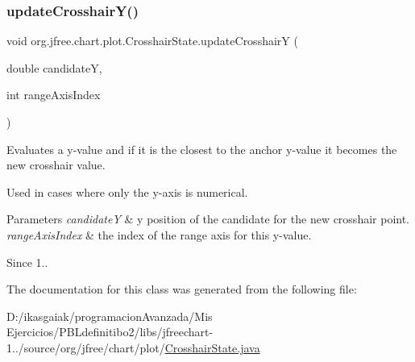 \subsubsection{\texorpdfstring{update\+Crosshair\+Y()}{updateCrosshairY()}\hspace{0.1cm}{\footnotesize\ttfamily [2/2]}}
{\footnotesize\ttfamily void org.\+jfree.\+chart.\+plot.\+Crosshair\+State.\+update\+CrosshairY (\begin{DoxyParamCaption}\item[{double}]{candidateY,  }\item[{int}]{range\+Axis\+Index }\end{DoxyParamCaption})}

Evaluates a y-\/value and if it is the closest to the anchor y-\/value it becomes the new crosshair value. 

Used in cases where only the y-\/axis is numerical.


\begin{DoxyParams}{Parameters}
{\em candidateY} & y position of the candidate for the new crosshair point. \\
\hline
{\em range\+Axis\+Index} & the index of the range axis for this y-\/value.\\
\hline
\end{DoxyParams}
\begin{DoxySince}{Since}
1.. 
\end{DoxySince}


The documentation for this class was generated from the following file\+:\begin{DoxyCompactItemize}
\item 
D\+:/ikasgaiak/programacion\+Avanzada/\+Mis Ejercicios/\+P\+B\+Ldefinitibo2/libs/jfreechart-\/1../source/org/jfree/chart/plot/\mbox{\hyperlink{_crosshair_state_8java}{Crosshair\+State.\+java}}\end{DoxyCompactItemize}

